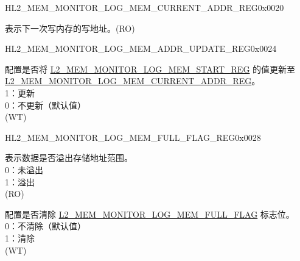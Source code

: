 \begin{register}{H}{L2\_MEM\_MONITOR\_LOG\_MEM\_CURRENT\_ADDR\_REG}{0x0020}\label{regdesc:L2MEMMONITORLOGMEMCURRENTADDRREG}
%
\regnewline%
\begin{regdesc}\begin{reglist}
\label{fielddesc:L2MEMMONITORLOGMEMCURRENTADDR}\item [L2\_MEM\_MONITOR\_LOG\_MEM\_CURRENT\_ADDR] 表示下一次写内存的写地址。(RO)
\end{reglist}\end{regdesc}
\end{register}

\begin{register}{H}{L2\_MEM\_MONITOR\_LOG\_MEM\_ADDR\_UPDATE\_REG}{0x0024}\label{regdesc:L2MEMMONITORLOGMEMADDRUPDATEREG}
%
%
\regnewline%
\begin{regdesc}\begin{reglist}
\label{fielddesc:L2MEMMONITORCLRLOGMEMADDRUPDATE}\item [L2\_MEM\_MONITOR\_LOG\_MEM\_ADDR\_UPDATE] 配置是否将 \hyperref[fielddesc:L2MEMMONITORLOGMEMSTART]{L2\_MEM\_MONITOR\_LOG\_MEM\_START\_REG} 的值更新至 \hyperref[fielddesc:L2MEMMONITORLOGMEMCURRENTADDR]{L2\_MEM\_MONITOR\_LOG\_MEM\_CURRENT\_ADDR\_REG}。\\
1：更新\\
0：不更新（默认值）\\
(WT)
\end{reglist}\end{regdesc}
\end{register}

\begin{register}{H}{L2\_MEM\_MONITOR\_LOG\_MEM\_FULL\_FLAG\_REG}{0x0028}\label{regdesc:L2MEMMONITORLOGMEMFULLFLAGREG}
%
%
%
\regnewline%
\begin{regdesc}\begin{reglist}
\label{fielddesc:L2MEMMONITORLOGMEMFULLFLAG}\item [L2\_MEM\_MONITOR\_LOG\_MEM\_FULL\_FLAG] 表示数据是否溢出存储地址范围。\\
0：未溢出\\
1：溢出\\
(RO)
\label{fielddesc:L2MEMMONITORCLRLOGMEMFULLFLAG}\item [L2\_MEM\_MONITOR\_CLR\_LOG\_MEM\_FULL\_FLAG] 配置是否清除 \hyperref[fielddesc:L2MEMMONITORLOGMEMFULLFLAG]{L2\_MEM\_MONITOR\_LOG\_MEM\_FULL\_FLAG} 标志位。\\
0：不清除（默认值）\\
1：清除\\
(WT)
\end{reglist}\end{regdesc}
\end{register}

